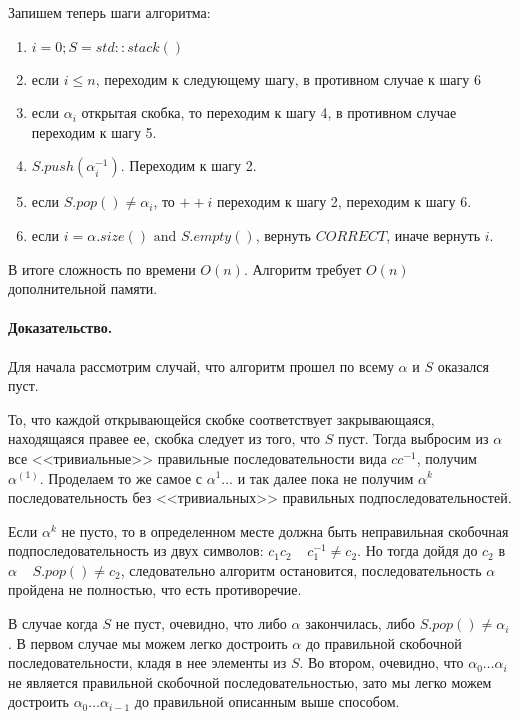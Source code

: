 \documentclass[12pt]{article}
\begin{document}
Запишем теперь шаги алгоритма:
\begin{enumerate}
    \item $i = 0; S = std::stack() $
    \item если $ i \le n $, переходим к следующему шагу, в противном случае к шагу 6
    \item если $ \alpha_i $ открытая скобка, то переходим к шагу 4, в противном случае переходим к шагу 5.
    \item $ S.push(\alpha_i^{-1}) $. Переходим к шагу 2.
    \item если $ S.pop() \ne \alpha_i $, то $ ++i $ переходим к шагу 2, переходим к шагу 6.
    \item если $ i = \alpha.size() \mbox{ and } S.empty() $, вернуть $ CORRECT $, иначе вернуть $ i $.
\end{enumerate}

В итоге сложность по времени $O(n)$. Алгоритм требует $O(n)$ дополнительной памяти.


\paragraph{Доказательство.}
Для начала рассмотрим случай, что алгоритм прошел по всему $ \alpha $ и $ S $ оказался пуст.

То, что каждой открывающейся скобке соответствует закрывающаяся, находящаяся правее ее, скобка следует
из того, что $ S $ пуст. Тогда выбросим из $ \alpha $ все <<тривиальные>> правильные последовательности вида
$cc^{-1}$, получим $ \alpha^{(1)} $. 
Проделаем то же самое с $ \alpha^{1} $... и так далее пока не получим
$ \alpha^{k} $ последовательность без <<тривиальных>> правильных подпоследовательностей. 

Если $ \alpha^{k} $ не пусто, то в определенном месте должна быть неправильная скобочная подпоследовательность из двух символов:
$ c_1c_2 \;\;\;\; c_1^{-1} \ne c_2 $. Но тогда дойдя до $ c_2 $ в $ \alpha \;\;\;\; S.pop() \ne c_2 $, следовательно
алгоритм остановится, последовательность $ \alpha $ пройдена не полностью, что есть противоречие.

В случае когда $ S $ не пуст, очевидно, что либо $ \alpha $ закончилась, либо $ S.pop() \ne \alpha_i $. В первом случае
мы можем легко достроить $ \alpha $ до правильной скобочной последовательности, кладя в нее элементы из $ S $. Во втором,
очевидно, что $ \alpha_0\dots \alpha_i $ не является правильной скобочной последовательностью, зато мы легко можем
достроить $ \alpha_0\dots \alpha_{i-1} $ до правильной описанным выше способом. 
\end{document}
